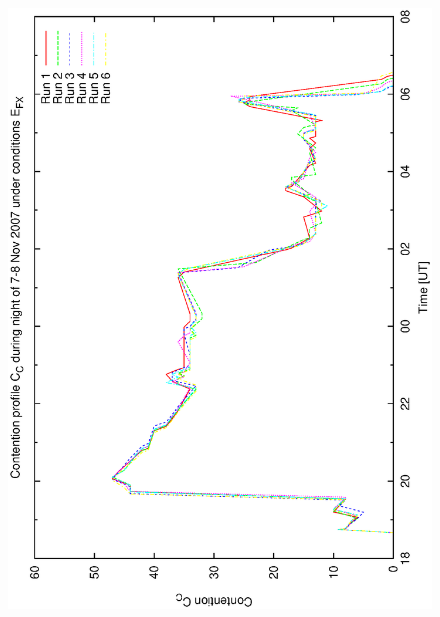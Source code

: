 \begin{figure}[h]
\begin{center}
{   \includegraphics[scale=0.25, angle=-90]{figures/bsb_ex_cont.eps}
  }
  

\end{center}
\end{figure}
